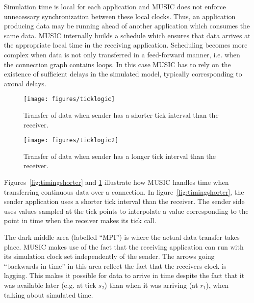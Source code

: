 \documentclass[a4paper,twoside]{report}
\begin{document}
Simulation time is local for each application
and MUSIC does not enforce unnecessary synchronization between these
local clocks.  Thus, an application producing data may be running
ahead of another application which consumes the same data.  MUSIC
internally builds a schedule which ensures that data arrives at the
appropriate local time in the receiving application.  Scheduling
becomes more complex when data is not only transferred in a
feed-forward manner, i.e. when the connection graph contains loops.
In this case MUSIC has to rely on the existence of sufficient delays
in the simulated model, typically corresponding to axonal
delays.

\begin{figure}
  \begin{center}
    \begin{minipage}{0.45\textwidth}
      \texttt{[image: figures/ticklogic]}
      \caption[Timing of data transfer, slowdown]{\label{fig:timingshorter}
        Transfer of data when sender has a shorter
        tick interval than the receiver.}
    \end{minipage}
    \hfill
    \begin{minipage}{0.45\textwidth}
      \texttt{[image: figures/ticklogic2]}
      \caption[Timing of data transfer, speedup]{\label{fig:timinglonger}
        Transfer of data when sender has a longer
        tick interval than the receiver.}
    \end{minipage}
  \end{center}
\end{figure}

Figures~\ref{fig:timingshorter} and \ref{fig:timinglonger} illustrate
how MUSIC handles time when transferring continuous data over a
connection.  In figure~\ref{fig:timingshorter}, the sender application
uses a shorter tick interval than the receiver.  The sender side uses
values sampled at the tick points to interpolate a value corresponding
to the point in time when the receiver makes its tick call.

The dark middle area (labelled ``MPI'') is where the actual data
transfer takes place.  MUSIC makes use of the fact that the receiving
application can run with its simulation clock set independently of the
sender.  The arrows going ``backwards in time'' in this area reflect
the fact that the receivers clock is lagging.  This makes it possible
for data to arrive in time despite the fact that it was available
later (e.g. at tick \(s_2\)) than when it was arriving (at \(r_1\)),
when talking about simulated time.
\end{document}
